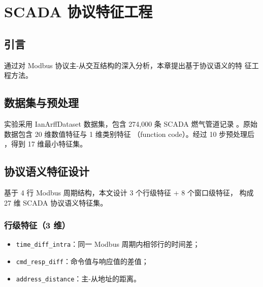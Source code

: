 
\chapter{SCADA 协议特征工程}
\label{chap:feat}


\section{引言}
\label{sec:feat_intro}

\par 通过对 Modbus 协议主-从交互结构的深入分析，本章提出基于协议语义的特
征工程方法。

\section{数据集与预处理}
\label{sec:feat_data}

\par 实验采用 IanArffDataset 数据集，包含 274{,}000 条 SCADA 燃气管道记录
\cite{ref:ian_arff_dataset}。原始数据包含 20 维数值特征与 1 维类别特征
（function code）。经过 10 步预处理后 \cite{ref:preprocess_pipeline}，得到
17 维最小特征集。

\section{协议语义特征设计}
\label{sec:feat_design}

\par 基于 4 行 Modbus 周期结构，本文设计 3 个行级特征 + 8 个窗口级特征，
构成 27 维 SCADA 协议语义特征集。

\subsection{行级特征（3 维）}
\label{sec:row_feat}

\begin{itemize}
  \item \texttt{time\_diff\_intra}：同一 Modbus 周期内相邻行的时间差；
  \item \texttt{cmd\_resp\_diff}：命令值与响应值的差值；
  \item \texttt{address\_distance}：主-从地址的距离。
\end{itemize}


